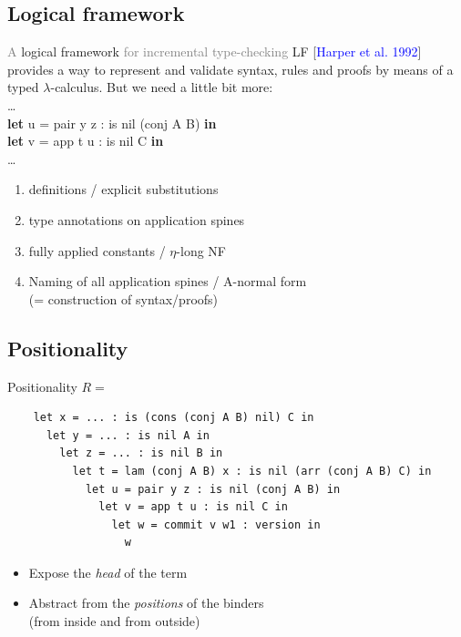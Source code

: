 \documentclass[ignorenonframetext,red]{beamer}
\newcommand\gray[1]{\textcolor{gray}{#1}}
\newcommand\cit[1]{[\textcolor{blue}{#1}]}
\begin{document}
\subsection{Logical framework}

\begin{frame}[fragile]{\gray{A} logical framework \gray{for incremental type-checking}}
  LF \cit{Harper et al. 1992} provides a way to represent and validate
  syntax, rules and proofs by means of a typed $\lambda$-calculus. But
  we need a little bit more: \\[1em]

  {\small\textsf{
      \noindent\ldots\\
      \alert<2>{\textbf{let}} \alert<5>u = \alert<4>{pair y z} : \alert<3>{is nil (conj A B)} \textbf{in}\\
      \hspace{2ex}\textbf{let} \alert<5>v = app t u : is nil C \textbf{in}\\
      \ldots
  }}
\pause
\begin{enumerate}[<+->]
\item definitions / explicit substitutions
\item type annotations on application spines
\item fully applied constants / $\eta$-long NF
\item Naming of all application spines / A-normal form\\
  {\footnotesize(= construction of syntax/proofs)}
\end{enumerate}

\end{frame}

\subsection{Positionality}

\begin{frame}[fragile]{Positionality}
$R =$ \scriptsize
\begin{lstlisting}
    let x = ... : is (cons (conj A B) nil) C in
      let y = ... : is nil A in
        let z = ... : is nil B in
          let t = lam (conj A B) x : is nil (arr (conj A B) C) in
            let u = pair y z : is nil (conj A B) in
              let v = app t u : is nil C in
                let w = commit v w1 : version in
                  w
\end{lstlisting}
\normalsize
\pause
\begin{itemize}
\item Expose the \emph{head} of the term
\pause {\Large \[(\lambda x y. T) U V\]}
\item \pause Abstract from the \emph{positions} of the binders \\
  {\footnotesize (from inside and from outside)}
\end{itemize}
\end{frame}
\end{document}
